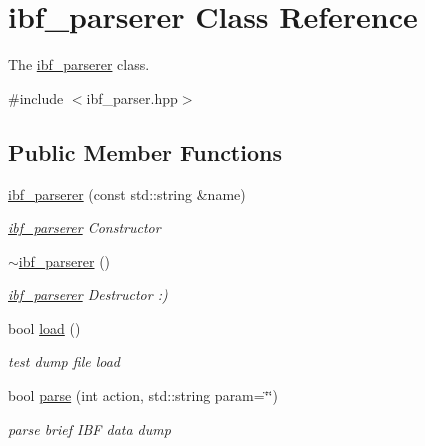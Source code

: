 \hypertarget{classibf__parserer}{}\section{ibf\+\_\+parserer Class Reference}
\label{classibf__parserer}


The \mbox{\hyperlink{classibf__parserer}{ibf\+\_\+parserer}} class.  




{\ttfamily \#include $<$ibf\+\_\+parser.\+hpp$>$}

\subsection*{Public Member Functions}
\begin{DoxyCompactItemize}
\item 
\mbox{\label{classibf__parserer_a68ed2693069c85fb82711b0844946d2a}} 
\mbox{\hyperlink{classibf__parserer_a68ed2693069c85fb82711b0844946d2a}{ibf\+\_\+parserer}} (const std\+::string \&name)
\begin{DoxyCompactList}\small\item\em \mbox{\hyperlink{classibf__parserer}{ibf\+\_\+parserer}} Constructor \end{DoxyCompactList}\item 
\mbox{\label{classibf__parserer_accb8a7b401c32ebd5d9c09b26fef3361}} 
\mbox{\hyperlink{classibf__parserer_accb8a7b401c32ebd5d9c09b26fef3361}{$\sim$ibf\+\_\+parserer}} ()
\begin{DoxyCompactList}\small\item\em \mbox{\hyperlink{classibf__parserer}{ibf\+\_\+parserer}} Destructor \+:) \end{DoxyCompactList}\item 
bool \mbox{\hyperlink{classibf__parserer_a630ed53f2480e4b2fc6c7c5b0f4edc07}{load}} ()
\begin{DoxyCompactList}\small\item\em test dump file load \end{DoxyCompactList}\item 
bool \mbox{\hyperlink{classibf__parserer_a1c1fb0c3f5ca1347264ab1ab4619bf15}{parse}} (int action, std\+::string param=\char`\"{}\char`\"{})
\begin{DoxyCompactList}\small\item\em parse brief I\+BF data dump \end{DoxyCompactList}\end{DoxyCompactItemize}


